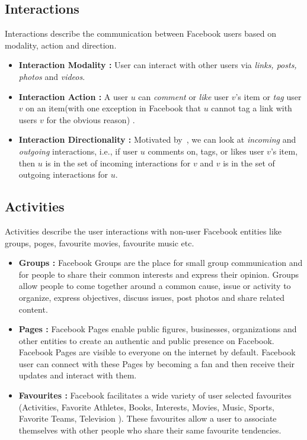 \subsection{Interactions}
Interactions describe the communication between Facebook users based on modality, action and direction.
\begin{itemize}
\item \textbf{Interaction Modality :}  User can interact with other users via
									 \textit{links, posts, photos} and \textit{videos}.
\item \textbf{Interaction Action :}  A user $u$ can \textit{comment} or \textit{like} 
									user $v$'s item or \textit{tag} user $v$ on an 
									item(with one exception in Facebook that $u$ cannot tag a 
									link with users $v$ for the obvious reason) .
\item \textbf{Interaction Directionality :} Motivated by~\cite{saez2011high}, we can look
      								at \textit{incoming} and \textit{outgoing} interactions, i.e.,
      								if user $u$ comments on, tags, or likes user $v$'s item,
      								then $u$ is in the set of incoming interactions for $v$
      								and $v$ is in the set of outgoing interactions for $u$.
      								
\end{itemize}								

\subsection{Activities}
Activities describe the user interactions with non-user Facebook entities like groups, poges, favourite movies, favourite music etc.
\begin{itemize}
  \item \textbf{Groups :} Facebook Groups are the place for small group communication and for people to share their common interests 
  						and express their opinion. Groups allow people to come together around a common cause, issue or activity to
  						organize, express objectives, discuss issues, post photos and share related content.
  \item \textbf{Pages :}  Facebook Pages enable public figures, businesses, organizations and other entities to create an authentic 
  						and public presence on Facebook. Facebook Pages are visible to everyone on the internet 
  						by default. Facebook user can connect with these Pages by becoming a fan and then receive their updates and interact with them.
  \item \textbf{Favourites :} Facebook facilitates a wide variety of user selected favourites (Activities, Favorite Athletes, Books, Interests, Movies, Music, Sports, Favorite Teams, Television ). 
  							These favourites allow a user to associate themselves with other people who share their same favourite tendencies.
\end{itemize} 
 
